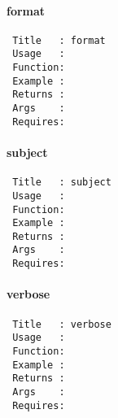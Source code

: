 \paragraph*{format\label{format}}
\begin{verbatim}
 Title   : format
 Usage   : 
 Function: 
 Example : 
 Returns : 
 Args    : 
 Requires:
\end{verbatim}
\paragraph*{subject\label{subject}}
\begin{verbatim}
 Title   : subject
 Usage   : 
 Function: 
 Example : 
 Returns : 
 Args    : 
 Requires:
\end{verbatim}
\paragraph*{verbose\label{verbose}}
\begin{verbatim}
 Title   : verbose
 Usage   : 
 Function: 
 Example : 
 Returns : 
 Args    : 
 Requires:
\end{verbatim}
